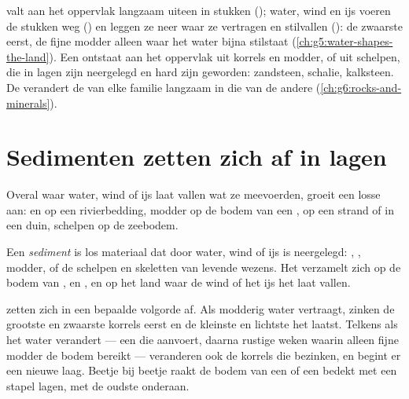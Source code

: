 \begin{recall}
 valt aan het oppervlak langzaam uiteen in stukken
(\emph{}); water, wind en ijs voeren de stukken weg
(\emph{}) en leggen ze neer waar ze vertragen en stilvallen
(\emph{}): de zwaarste eerst, de fijne modder alleen waar het
water bijna stilstaat (\cref{ch:g5:water-shapes-the-land}). Een
\emph{} ontstaat aan het oppervlak uit korrels  en
modder, of uit schelpen, die in lagen zijn neergelegd en hard zijn
geworden: zandsteen, schalie, kalksteen. De 
verandert de  van elke familie langzaam in die van de andere
(\cref{ch:g6:rocks-and-minerals}).
\end{recall}

\section{Sedimenten zetten zich af in lagen}

Overal waar water, wind of ijs laat vallen wat ze meevoerden, groeit een
losse  aan:  en  op een rivierbedding, modder op de bodem
van een ,  op een strand of in een duin, schelpen op de zeebodem.

\begin{definition}[Sediment]\label{def:g7:sediments-and-fossils:sediment}
Een \emph{sediment} is los materiaal dat door water, wind
of ijs is neergelegd: , , modder, of de schelpen en skeletten van
levende wezens. Het verzamelt zich op de bodem van ,  en
, en op het land waar de wind of het ijs het laat vallen.
\end{definition}

 zetten zich in een bepaalde volgorde af. Als modderig water
vertraagt, zinken de grootste en zwaarste korrels eerst en de kleinste en
lichtste het laatst. Telkens als het water verandert --- een 
die  aanvoert, daarna rustige weken waarin alleen fijne modder de
bodem bereikt --- veranderen ook de korrels die bezinken, en begint er een
nieuwe laag. Beetje bij beetje raakt de bodem van een  of een 
bedekt met een stapel lagen, met de oudste onderaan.

